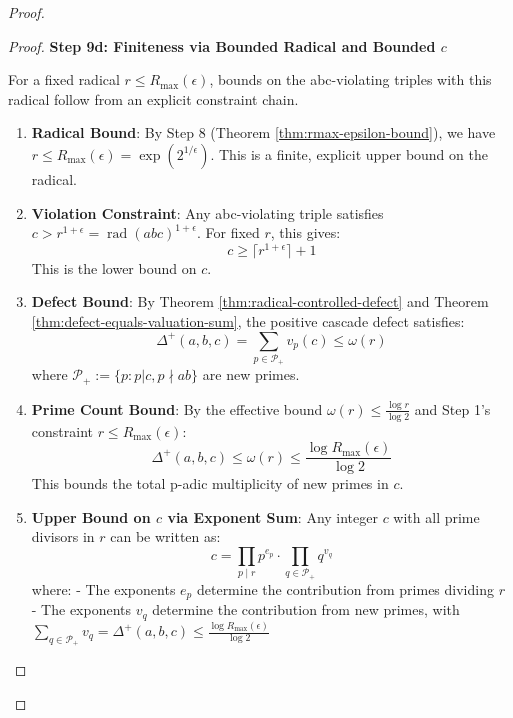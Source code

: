 \begin{proof}
\begin{proof}
\noindent \textbf{Step 9d: Finiteness via Bounded Radical and Bounded $c$}

For a fixed radical $r \leq R_{\max}(\epsilon)$, bounds on the abc-violating triples with this radical follow from an explicit constraint chain.

\begin{enumerate}
\item \textbf{Radical Bound}: By Step 8 (Theorem \ref{thm:rmax-epsilon-bound}), we have $r \leq R_{\max}(\epsilon) = \exp(2^{1/\epsilon})$. This is a finite, explicit upper bound on the radical.

\item \textbf{Violation Constraint}: Any abc-violating triple satisfies $c > r^{1+\epsilon} = \operatorname{rad}(abc)^{1+\epsilon}$. For fixed $r$, this gives:
\begin{equation}
c \geq \lceil r^{1+\epsilon} \rceil + 1
\end{equation}
This is the lower bound on $c$.

\item \textbf{Defect Bound}: By Theorem \ref{thm:radical-controlled-defect} and Theorem \ref{thm:defect-equals-valuation-sum}, the positive cascade defect satisfies:
\begin{equation}
\Delta^{+}(a,b,c) = \sum_{p \in \mathcal{P}_+} v_p(c) \leq \omega(r)
\end{equation}
where $\mathcal{P}_+ := \{p : p | c, p \nmid ab\}$ are new primes.

\item \textbf{Prime Count Bound}: By the effective bound $\omega(r) \leq \frac{\log r}{\log 2}$ and Step 1's constraint $r \leq R_{\max}(\epsilon)$:
\begin{equation}
\Delta^{+}(a,b,c) \leq \omega(r) \leq \frac{\log R_{\max}(\epsilon)}{\log 2}
\end{equation}
This bounds the total p-adic multiplicity of new primes in $c$.

\item \textbf{Upper Bound on $c$ via Exponent Sum}: Any integer $c$ with all prime divisors in $r$ can be written as:
\begin{equation}
c = \prod_{p \mid r} p^{e_p} \cdot \prod_{q \in \mathcal{P}_+} q^{v_q}
\end{equation}
where:
- The exponents $e_p$ determine the contribution from primes dividing $r$
- The exponents $v_q$ determine the contribution from new primes, with $\sum_{q \in \mathcal{P}_+} v_q = \Delta^{+}(a,b,c) \leq \frac{\log R_{\max}(\epsilon)}{\log 2}$


\end{enumerate}
\end{proof}
\end{proof}
